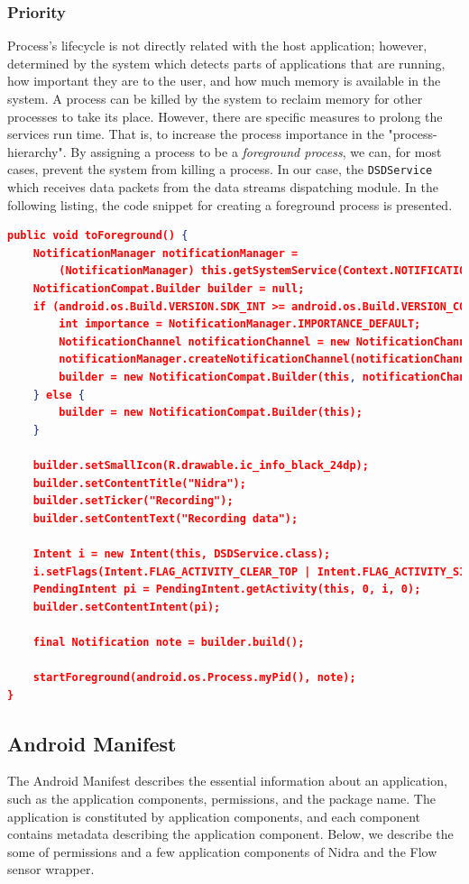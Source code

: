 \subsubsection{Priority}
Process's lifecycle is not directly related with the host application; however, determined by the system which detects parts of applications that are running, how important they are to the user, and how much memory is available in the system. A process can be killed by the system to reclaim memory for other processes to take its place. However, there are specific measures to prolong the services run time. That is, to increase the process importance in the "process-hierarchy". By assigning a process to be a \textit{foreground process}, we can, for most cases, prevent the system from killing a process. In our case, the \verb|DSDService| which receives data packets from the data streams dispatching module. In the following listing, the code snippet for creating a foreground process is presented.

\begin{lstlisting}[language=json, caption={}, captionpos=b]
public void toForeground() {
    NotificationManager notificationManager = 
        (NotificationManager) this.getSystemService(Context.NOTIFICATION_SERVICE);
    NotificationCompat.Builder builder = null;
    if (android.os.Build.VERSION.SDK_INT >= android.os.Build.VERSION_CODES.O) {
        int importance = NotificationManager.IMPORTANCE_DEFAULT;
        NotificationChannel notificationChannel = new NotificationChannel("ID", "Name", importance);
        notificationManager.createNotificationChannel(notificationChannel);
        builder = new NotificationCompat.Builder(this, notificationChannel.getId());
    } else {
        builder = new NotificationCompat.Builder(this);
    }

    builder.setSmallIcon(R.drawable.ic_info_black_24dp);
    builder.setContentTitle("Nidra");
    builder.setTicker("Recording");
    builder.setContentText("Recording data");

    Intent i = new Intent(this, DSDService.class);
    i.setFlags(Intent.FLAG_ACTIVITY_CLEAR_TOP | Intent.FLAG_ACTIVITY_SINGLE_TOP);
    PendingIntent pi = PendingIntent.getActivity(this, 0, i, 0);
    builder.setContentIntent(pi);

    final Notification note = builder.build();

    startForeground(android.os.Process.myPid(), note);
}
\end{lstlisting}

\subsection{Android Manifest} \label{impl:manifest}
The Android Manifest describes the essential information about an application, such as the application components, permissions, and the package name. The application is constituted by application components, and each component contains metadata describing the application component. Below, we describe the some of permissions and a few application components of Nidra and the Flow sensor wrapper.

